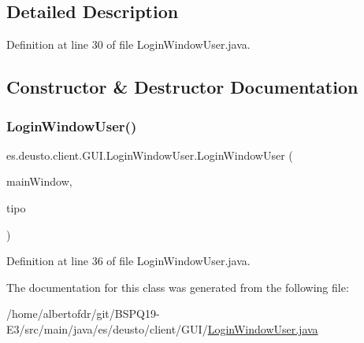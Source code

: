\subsection{Detailed Description}


Definition at line 30 of file Login\+Window\+User.\+java.



\subsection{Constructor \& Destructor Documentation}
\mbox{\label{classes_1_1deusto_1_1client_1_1_g_u_i_1_1_login_window_user_a616579d965d1677e6956a864a944ee87}} 
\subsubsection{\texorpdfstring{Login\+Window\+User()}{LoginWindowUser()}}
{\footnotesize\ttfamily es.\+deusto.\+client.\+G\+U\+I.\+Login\+Window\+User.\+Login\+Window\+User (\begin{DoxyParamCaption}\item[{\hyperlink{classes_1_1deusto_1_1client_1_1_g_u_i_1_1_main_window}{Main\+Window}}]{main\+Window,  }\item[{int}]{tipo }\end{DoxyParamCaption})}



Definition at line 36 of file Login\+Window\+User.\+java.



The documentation for this class was generated from the following file\+:\begin{DoxyCompactItemize}
\item 
/home/albertofdr/git/\+B\+S\+P\+Q19-\/\+E3/src/main/java/es/deusto/client/\+G\+U\+I/\hyperlink{_login_window_user_8java}{Login\+Window\+User.\+java}\end{DoxyCompactItemize}
